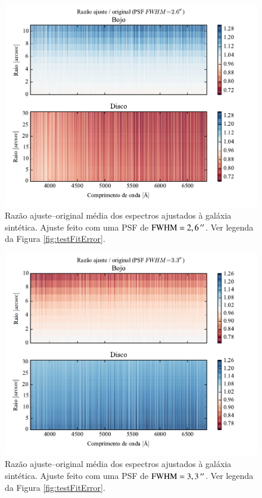 \begin{figure}
	\includegraphics{figuras/simulation_error_psf26}
	\caption[Razão ajuste--original (teste com PSF $\mathrm{FWHM} = 2,6\,\arcs$).]
	{Razão ajuste--original média dos espectros ajustados à galáxia sintética.
	Ajuste feito com uma PSF de $\mathrm{FWHM} = 2,6\,\arcs$. Ver legenda da Figura
	\ref{fig:testFitError}.}
	\label{fig:testFitError26}
\end{figure}

\begin{figure}
	\includegraphics{figuras/simulation_error_psf33}
	\caption[Razão ajuste--original (teste com PSF $\mathrm{FWHM} = 3,3\,\arcs$).]
	{Razão ajuste--original média dos espectros ajustados à galáxia sintética.
	Ajuste feito com uma PSF de $\mathrm{FWHM} = 3,3\,\arcs$. Ver legenda da Figura
	\ref{fig:testFitError}.}
	\label{fig:testFitError33}
\end{figure}


